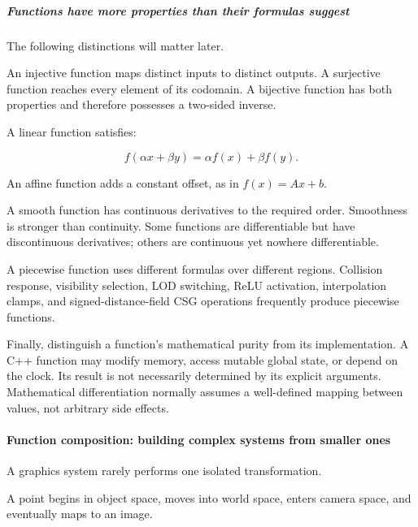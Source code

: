 \subparagraph{Functions have more properties than their formulas suggest}\label{01-foundations-i-ch020-functions-have-more-properties-than-their-formulas-suggest}

\hypertarget{01-foundations-i-ch020-functions-have-more-properties-than-their-formulas-suggest}{}

The following distinctions will matter later.

An injective function maps distinct inputs to distinct outputs. A surjective function reaches every element of its codomain. A bijective function has both properties and therefore possesses a two-sided inverse.

A linear function satisfies:

\[
f(\alpha x+\beta y)=\alpha f(x)+\beta f(y).
\]

An affine function adds a constant offset, as in \(f(x)=Ax+b\).

A smooth function has continuous derivatives to the required order. Smoothness is stronger than continuity. Some functions are differentiable but have discontinuous derivatives; others are continuous yet nowhere differentiable.

A piecewise function uses different formulas over different regions. Collision response, visibility selection, LOD switching, ReLU activation, interpolation clamps, and signed-distance-field CSG operations frequently produce piecewise functions.

Finally, distinguish a function's mathematical purity from its implementation. A C++ function may modify memory, access mutable global state, or depend on the clock. Its result is not necessarily determined by its explicit arguments. Mathematical differentiation normally assumes a well-defined mapping between values, not arbitrary side effects.

\paragraph{Function composition: building complex systems from smaller ones}\label{01-foundations-i-ch020-function-composition-building-complex-systems-from-smaller-ones}

\hypertarget{01-foundations-i-ch020-function-composition-building-complex-systems-from-smaller-ones}{}

A graphics system rarely performs one isolated transformation.

A point begins in object space, moves into world space, enters camera space, and eventually maps to an image.

